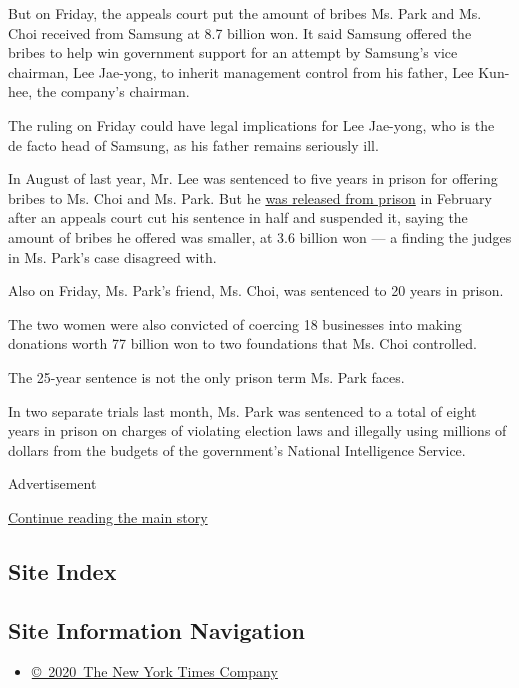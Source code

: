 But on Friday, the appeals court put the amount of bribes Ms. Park and
Ms. Choi received from Samsung at 8.7 billion won. It said Samsung
offered the bribes to help win government support for an attempt by
Samsung's vice chairman, Lee Jae-yong, to inherit management control
from his father, Lee Kun-hee, the company's chairman.

The ruling on Friday could have legal implications for Lee Jae-yong, who
is the de facto head of Samsung, as his father remains seriously ill.

In August of last year, Mr. Lee was sentenced to five years in prison
for offering bribes to Ms. Choi and Ms. Park. But he
\href{https://www.nytimes.com/2018/02/05/business/samsung-lee-jae-yong-appeal.html}{was
released from prison} in February after an appeals court cut his
sentence in half and suspended it, saying the amount of bribes he
offered was smaller, at 3.6 billion won --- a finding the judges in Ms.
Park's case disagreed with.

Also on Friday, Ms. Park's friend, Ms. Choi, was sentenced to 20 years
in prison.

The two women were also convicted of coercing 18 businesses into making
donations worth 77 billion won to two foundations that Ms. Choi
controlled.

The 25-year sentence is not the only prison term Ms. Park faces.

In two separate trials last month, Ms. Park was sentenced to a total of
eight years in prison on charges of violating election laws and
illegally using millions of dollars from the budgets of the government's
National Intelligence Service.

Advertisement

\protect\hyperlink{after-bottom}{Continue reading the main story}

\hypertarget{site-index}{%
\subsection{Site Index}\label{site-index}}

\hypertarget{site-information-navigation}{%
\subsection{Site Information
Navigation}\label{site-information-navigation}}

\begin{itemize}
\tightlist
\item
  \href{https://help.nytimes.com/hc/en-us/articles/115014792127-Copyright-notice}{©~2020~The
  New York Times Company}
\end{itemize}

